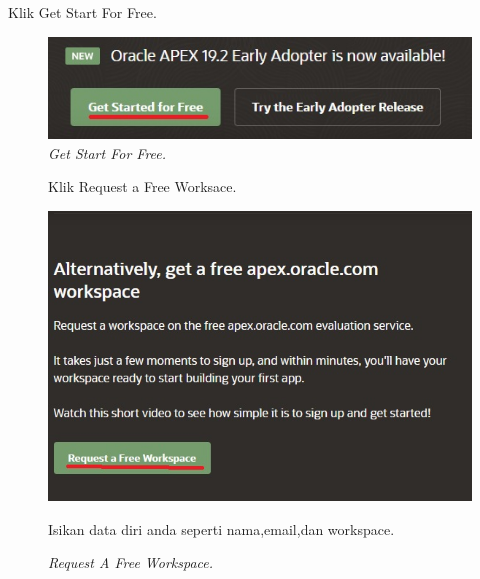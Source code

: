 \begin{enumerate}
\item[1]Klik Get Start For Free.

\begin{figure}[!htbp]
    \begin{center}
    \includegraphics[scale=0.7]{figures/start.jpg}
    \caption{\textit{Get Start For Free.}}
    \end{center}   
    \end{figure}
    
\begin{figure}[!htbp]
\item[2]Klik Request a Free Worksace.

    \begin{center}
    \includegraphics[scale=0.5]{figures/request_wspace.jpg}
    \caption{\textit{Request A Free Workspace.}}
    \end{center}

\item[3]Isikan data diri anda seperti nama,email,dan workspace.


\end{figure}
\end{enumerate}
